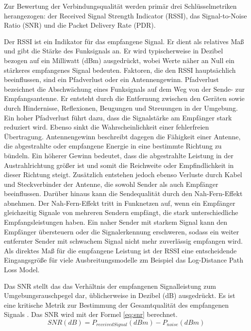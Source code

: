 Zur Bewertung der Verbindungsqualität werden primär drei Schlüsselmetriken herangezogen: der Received Signal Strength Indicator (RSSI), das Signal-to-Noise Ratio (SNR) und die Packet Delivery Rate (PDR).

Der RSSI ist ein Indikator für das empfangene Signal. Er dient als relatives Maß und gibt die Stärke des Funksignals an. Er wird typischerweise in Dezibel bezogen auf ein Milliwatt (dBm) ausgedrückt, wobei Werte näher an Null ein stärkeres empfangenes Signal bedeuten. Faktoren, die den RSSI hauptsächlich beeinflussen, sind ein Pfadverlust oder ein Antennengewinn. Pfadverlust bezeichnet die Abschwächung eines Funksignals auf dem Weg von der Sende- zur Empfangsantenne. Er entsteht durch die Entfernung zwischen den Geräten sowie durch Hindernisse, Reflexionen, Beugungen und Streuungen in der Umgebung. Ein hoher Pfadverlust führt dazu, dass die Signalstärke am Empfänger stark reduziert wird. Ebenso sinkt die Wahrscheinlichkeit einer fehlerfreien Übertragung. Antennengewinn beschreibt dagegen die Fähigkeit einer Antenne, die abgestrahlte oder empfangene Energie in eine bestimmte Richtung zu bündeln. Ein höherer Gewinn bedeutet, dass die abgestrahlte Leistung in der Austrahlrichtung größer ist und somit die Reichweite oder Empfindlichkeit in dieser Richtung steigt. Zusätzlich entstehen jedoch ebenso Verluste durch Kabel und Steckverbinder der Antenne, die sowohl Sender als auch Empfänger beeinflussen. Darüber hinaus kann die Sendequalität durch den Nah-Fern-Effekt abnehmen. Der Nah-Fern-Effekt tritt in Funknetzen auf, wenn ein Empfänger gleichzeitig Signale von mehreren Sendern empfängt, die stark unterschiedliche Empfangsleistungen haben. Ein naher Sender mit starkem Signal kann den Empfänger übersteuern oder die Signalerkennung erschweren, sodass ein weiter entfernter Sender mit schwachem Signal nicht mehr zuverlässig empfangen wird. Als direktes Maß für die empfangene Leistung ist der RSSI eine entscheidende Eingangsgröße für viele Ausbreitungsmodelle zm Beispiel das Log-Distance Path Loss Model. 

Das SNR stellt das das Verhältnis der empfangenen Signalleistung zum Umgebungsrauschpegel dar, üblicherweise in Dezibel (dB) ausgedrückt. Es ist eine kritische Metrik zur Bestimmung der Gesamtqualität des empfangenen Signals \autocite{SignaltoNoiseRatioSNR2020}. Das SNR wird mit der Formel \ref{eq:snr} berechnet.
\begin{equation}
\label{eq:snr}
SNR (dB) = P_{receivedSignal} (dBm) - P_{noise} (dBm)
\end{equation}


